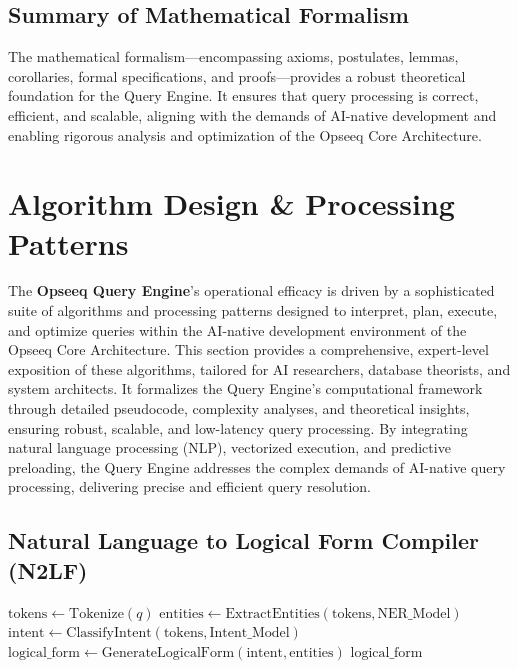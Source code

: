 \documentclass[11pt]{article}
\begin{document}
\subsection{Summary of Mathematical Formalism}

The mathematical formalism—encompassing axioms, postulates, lemmas, corollaries, formal specifications, and proofs—provides a robust theoretical foundation for the Query Engine. It ensures that query processing is correct, efficient, and scalable, aligning with the demands of AI-native development and enabling rigorous analysis and optimization of the Opseeq Core Architecture.

\section{Algorithm Design \& Processing Patterns}
\label{sec:algorithms}

The \textbf{Opseeq Query Engine}'s operational efficacy is driven by a sophisticated suite of algorithms and processing patterns designed to interpret, plan, execute, and optimize queries within the AI-native development environment of the Opseeq Core Architecture. This section provides a comprehensive, expert-level exposition of these algorithms, tailored for AI researchers, database theorists, and system architects. It formalizes the Query Engine’s computational framework through detailed pseudocode, complexity analyses, and theoretical insights, ensuring robust, scalable, and low-latency query processing. By integrating natural language processing (NLP), vectorized execution, and predictive preloading, the Query Engine addresses the complex demands of AI-native query processing, delivering precise and efficient query resolution.

\subsection{Natural Language to Logical Form Compiler (N2LF)}
\label{subsec:n2lf}

\begin{algorithm}
\caption{N2LF Compiler}
\label{alg:n2lf}
\begin{algorithmic}[1]
    \State \( \text{tokens} \gets \text{Tokenize}(q) \)
    \State \( \text{entities} \gets \text{ExtractEntities}(\text{tokens}, \text{NER\_Model}) \)
    \State \( \text{intent} \gets \text{ClassifyIntent}(\text{tokens}, \text{Intent\_Model}) \)
    \State \( \text{logical\_form} \gets \text{GenerateLogicalForm}(\text{intent}, \text{entities}) \)
    \State \Return \( \text{logical\_form} \)
\EndFunction
\end{algorithmic}
\end{algorithm}
\end{document}
